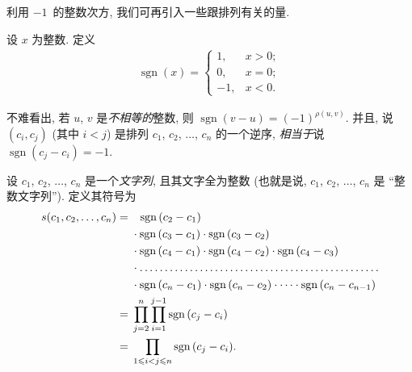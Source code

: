 \vspace{2ex}

利用 \(-1\)~的整数次方,
我们可再引入一些跟排列有关的量.

\begin{definition}[符号记号]
    设 \(x\) 为整数.
    定义
    \begin{align*}
        \operatorname{sgn} {(x)}
        =
        \begin{cases}
            1,  & x > 0; \\
            0,  & x = 0; \\
            -1, & x < 0.
        \end{cases}
    \end{align*}
\end{definition}

不难看出, 若 \(u\), \(v\) 是\emph{不相等的}整数,
则 \(\operatorname{sgn} {(v - u)} = (-1)^{\rho(u, v)}\).
并且, 说 \((c_i, c_j)\) (其中 \(i < j\))
是排列
\(c_1\), \(c_2\), \(\dots\), \(c_n\)
的一个逆序,
\emph{相当于}说
\(\operatorname{sgn} {(c_j - c_i)} = -1\).

\begin{definition}[整数文字列的符号]
    设 \(c_1\), \(c_2\), \(\dots\), \(c_n\) 是一个\emph{文字列},
    且其文字全为整数
    (也就是说, \(c_1\), \(c_2\), \(\dots\), \(c_n\) 是
    ``整数文字列'').
    定义其符号为
    \begin{align*}
        s(c_1, c_2, \dots, c_n)
        = {} & \hphantom{\cdot\,\,}
        \operatorname{sgn} {(c_2 - c_1)}
        \\
             & \cdot \operatorname{sgn} {(c_3 - c_1)}
        \cdot \operatorname{sgn} {(c_3 - c_2)}
        \\
             & \cdot \operatorname{sgn} {(c_4 - c_1)}
        \cdot \operatorname{sgn} {(c_4 - c_2)}
        \cdot \operatorname{sgn} {(c_4 - c_3)}
        \\
             & \cdot
        \dots \dots \dots \dots
        \dots \dots \dots \dots
        \dots \dots \dots \dots
        \dots \dots \dots \dots
        \\
             & \cdot \operatorname{sgn} {(c_n - c_1)}
        \cdot \operatorname{sgn} {(c_n - c_2)} \cdot \dots
        \cdot \operatorname{sgn} {(c_n - c_{n-1})}
        \\
        = {} & \prod_{j = 2}^{n} {
        \prod_{i = 1}^{j - 1} {\operatorname{sgn} {(c_j - c_i)}} }
        \\
        = {} & \prod_{1 \leq i < j \leq n}
        {\operatorname{sgn} {(c_j - c_i)}}.
    \end{align*}
\end{definition}

